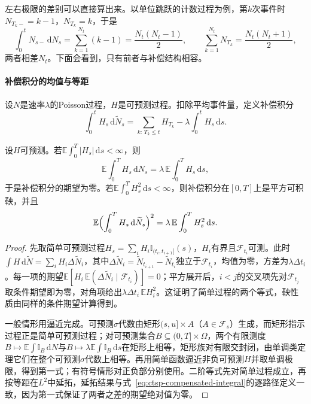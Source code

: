 左右极限的差别可以直接算出来。以单位跳跃的计数过程为例，第$k$次事件时$N_{T_k-}=k-1$，$N_{T_k}=k$，于是
\[
  \int_0^tN_{s-}\,\mathrm dN_s=\sum_{k=1}^{N_t}(k-1)=\frac{N_t(N_t-1)}2,\qquad
  \sum_{k=1}^{N_t}N_{T_k}=\frac{N_t(N_t+1)}2 ,
\]
两者相差$N_t$。下面会看到，只有前者与补偿结构相容。

\paragraph{补偿积分的均值与等距}
设$N$是速率$\lambda$的Poisson过程，$H$是可预测过程。扣除平均事件量，定义补偿积分
\begin{equation}
  \int_0^tH_s\,\mathrm d\widetilde N_s=\sum_{k:\,T_k\leq t}H_{T_k}-\lambda\int_0^tH_s\,\mathrm ds .
  \label{eq:ctsp-compensated-integral}
\end{equation}

\begin{theorem}[补偿积分的均值与二阶矩]
  \label{thm:ctsp-poisson-integral}
  设$H$可预测。若\allowbreak$\mathbb E\int_0^T|H_s|\,\mathrm ds<\infty$，则
  \[
    \mathbb E\int_0^TH_s\,\mathrm dN_s=\lambda\,\mathbb E\int_0^TH_s\,\mathrm ds,
  \]
  于是补偿积分的期望为零。若$\mathbb E\int_0^TH_s^2\,\mathrm ds<\infty$，则补偿积分在$[0,T]$上是平方可积鞅，并且
  \begin{equation}
    \mathbb E\Bigl(\int_0^TH_s\,\mathrm d\widetilde N_s\Bigr)^2=\lambda\,\mathbb E\int_0^TH_s^2\,\mathrm ds .
    \label{eq:ctsp-poisson-isometry}
  \end{equation}
\end{theorem}

\begin{proof}
先取简单可预测过程$H_s=\sum_iH_i\mathbb I_{(t_i,t_{i+1}]}(s)$，$H_i$有界且$\mathcal F_{t_i}$可测。此时$\int H\,\mathrm d\widetilde N=\sum_iH_i\Delta\widetilde N_i$，其中$\Delta\widetilde N_i=\widetilde N_{t_{i+1}}-\widetilde N_{t_i}$独立于$\mathcal F_{t_i}$，均值为零，方差为$\lambda\Delta t_i$。每一项的期望$\mathbb E[H_i\,\mathbb E(\Delta\widetilde N_i\mid\mathcal F_{t_i})]=0$；平方展开后，$i<j$的交叉项先对$\mathcal F_{t_j}$取条件期望即为零，对角项给出$\lambda\Delta t_i\,\mathbb EH_i^2$。这证明了简单过程的两个等式，鞅性质由同样的条件期望计算得到。

一般情形用逼近完成。可预测$\sigma$代数由矩形$(s,u]\times A$（$A\in\mathcal F_s$）生成，而矩形指示过程正是简单可预测过程；对可预测集合$B\subseteq(0,T]\times\Omega$，两个有限测度$B\mapsto\mathbb E\int\mathbb I_B\,\mathrm dN$与$B\mapsto\lambda\mathbb E\int\mathbb I_B\,\mathrm ds$在矩形上相等，矩形族对有限交封闭，由单调类定理它们在整个可预测$\sigma$代数上相等。再用简单函数逼近非负可预测$H$并取单调极限，得到第一式；有符号情形对正负部分别使用。二阶等式先对简单过程成立，再按等距在$L^2$中延拓，延拓结果与式~\eqref{eq:ctsp-compensated-integral}的逐路径定义一致，因为第一式保证了两者之差的期望绝对值为零。
\end{proof}

